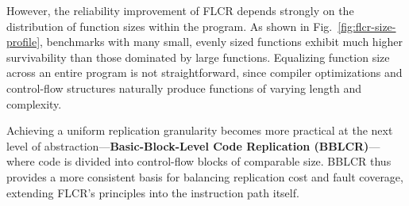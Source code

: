 However, the reliability improvement of FLCR depends strongly on the distribution of
function sizes within the program. As shown in Fig.~\ref{fig:flcr-size-profile},
benchmarks with many small, evenly sized functions exhibit much higher survivability
than those dominated by large functions. Equalizing function size across an entire
program is not straightforward, since compiler optimizations and control-flow structures
naturally produce functions of varying length and complexity.

Achieving a uniform replication granularity becomes more practical at the next level
of abstraction—\textbf{Basic-Block-Level Code Replication (BBLCR)}—where code is divided
into control-flow blocks of comparable size. BBLCR thus provides a more consistent basis
for balancing replication cost and fault coverage, extending FLCR’s principles into the
instruction path itself.